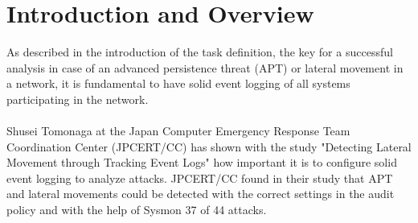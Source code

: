 \section{Introduction and Overview}
As described in the introduction of the task definition, the key for a successful analysis in case of an advanced persistence threat (APT) or lateral movement in a network, it is fundamental to have solid event logging of all systems participating in the network.
\\\\
Shusei Tomonaga at the Japan Computer Emergency Response Team Coordination Center (JPCERT/CC) has shown with the study "Detecting Lateral Movement through Tracking Event Logs" \cite{JPCERTDetectingLateralMovement} how important it is to configure solid event logging to analyze attacks. JPCERT/CC found in their study that APT and lateral movements could be detected with the correct settings in the audit policy and with the help of Sysmon 37 of 44 attacks.